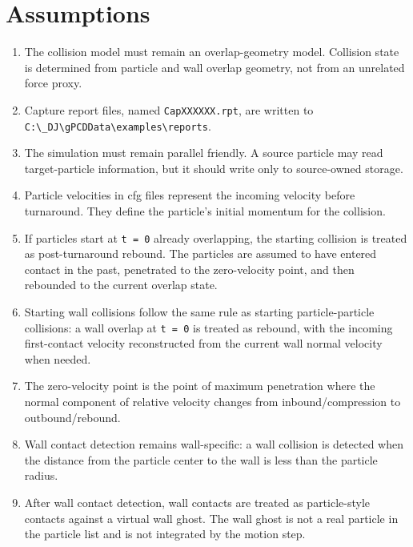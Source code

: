 \section{Assumptions}

\begin{enumerate}
    \item The collision model must remain an overlap-geometry model. Collision state is determined from particle and wall overlap geometry, not from an unrelated force proxy.

    \item Capture report files, named \texttt{CapXXXXXX.rpt}, are written to \texttt{C:\textbackslash\_DJ\textbackslash gPCDData\textbackslash examples\textbackslash reports}.

    \item The simulation must remain parallel friendly. A source particle may read target-particle information, but it should write only to source-owned storage.

    \item Particle velocities in cfg files represent the incoming velocity before turnaround. They define the particle's initial momentum for the collision.

    \item If particles start at \texttt{t = 0} already overlapping, the starting collision is treated as post-turnaround rebound. The particles are assumed to have entered contact in the past, penetrated to the zero-velocity point, and then rebounded to the current overlap state.

    \item Starting wall collisions follow the same rule as starting particle-particle collisions: a wall overlap at \texttt{t = 0} is treated as rebound, with the incoming first-contact velocity reconstructed from the current wall normal velocity when needed.

    \item The zero-velocity point is the point of maximum penetration where the normal component of relative velocity changes from inbound/compression to outbound/rebound.

    \item Wall contact detection remains wall-specific: a wall collision is detected when the distance from the particle center to the wall is less than the particle radius.

    \item After wall contact detection, wall contacts are treated as particle-style contacts against a virtual wall ghost. The wall ghost is not a real particle in the particle list and is not integrated by the motion step.


\end{enumerate}
